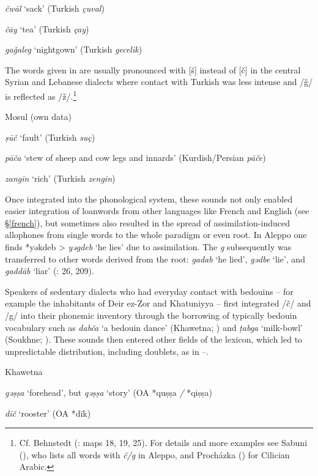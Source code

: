 \documentclass[output=paper]{langsci/langscibook}
\begin{document}
\textit{čwāl} ‘sack’ (Turkish \textit{çuval})

\textit{čāy} ‘tea’ (Turkish \textit{çay})

\textit{gaǧaleg} ‘nightgown’ (Turkish \textit{gecelik})
\z

The words given in  are usually pronounced with [š] instead of [č] in the central Syrian and Lebanese dialects where contact with Turkish was less intense and /ǧ/ is reflected as /ž/.\footnote{Cf. Behnstedt (\citeyear{Behnstedt1997}: maps 18, 19, 25). For details and more examples see Sabuni (\citeyear[205--210]{Sabuni1980}), who lists all words with \textit{č/g} in Aleppo, and Procházka (\citeyear[185]{Procházka2002Adana}) for Cilician Arabic.}

\ea\label{Mosul}
Mosul (own data)

\textit{ṣūč} ‘fault’ (Turkish \textit{suç})

\textit{pāča} ‘stew of sheep and cow legs and innards’ (Kurdish/Persian \textit{pāče})

\textit{zangīn} ‘rich’ (Turkish \textit{zengin})
\z

Once integrated into the phonological system, these sounds not only enabled easier integration of loanwords from other languages like French and English (see §\ref{french}), but sometimes also resulted in the spread of assimilation-induced allophones from single words to the whole paradigm or even root. In Aleppo one finds *yəkdeb > \textit{yəgdeb} ‘he lies’ due to assimilation. The \textit{g} subsequently was transferred to other words derived from the root: \textit{gadab} ‘he lied’, \textit{gədbe} ‘lie’, and \textit{gaddāb} ‘liar’ (\citealt{Sabuni1980}: 26, 209). 

Speakers of sedentary dialects who had everyday contact with bedouins – for example the inhabitants of Deir ez-Zor and Khatuniyya – first integrated /č/ and /g/ into their phonemic inventory through the borrowing of typically bedouin vocabulary such as \textit{dabča} ‘a bedouin dance’ (Khawetna; \citealt[29]{Talay1999}) and \textit{ṭabga} ‘milk-bowl’ (Soukhne; \citealt[310]{Behnstedt1994Soukhne}). These sounds then entered other fields of the lexicon, which led to unpredictable distribution, including doublets, as in --.

\ea\label{Khawetna} Khawetna \citep[28--31]{Talay1999}  

\textit{gəṣṣa} ‘forehead’, but \textit{qəṣṣa} ‘story’ (OA *quṣṣa \textit{/} *qiṣṣa)

\textit{dīč} ‘rooster’  (OA *dīk)
\z
\end{document}
